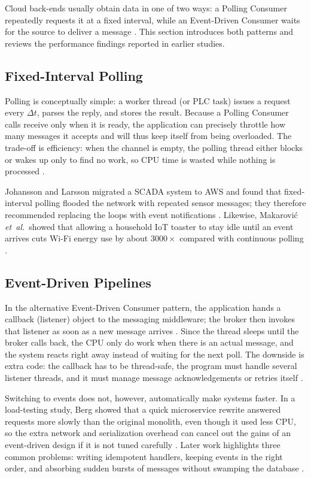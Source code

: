\documentclass[nomenclature, english, biblatex]{kththesis}
\numberwithin{listing}{chapter}
\begin{document}
Cloud back-ends usually obtain data in one of two ways: a Polling Consumer repeatedly requests it at a fixed interval, while an Event-Driven Consumer waits for the source to deliver a message \cite[Chap.~10]{Hohpe2003EIP}. This section introduces both patterns and reviews the performance findings reported in earlier studies.


\subsection{Fixed-Interval Polling}
Polling is conceptually simple: a worker thread (or PLC task) issues a request every $\Delta t$, parses the reply, and stores the result.
Because a Polling Consumer calls receive only when it is ready, the application can precisely throttle how many messages it accepts and will thus keep itself from being overloaded.
The trade-off is efficiency: when the channel is empty, the polling thread either blocks or wakes up only to find no work, so CPU time is wasted while nothing is processed \cite[pp.~494–497]{Hohpe2003EIP}.

Johansson and Larsson migrated a \gls{SCADA} system to AWS and found that fixed‐interval polling flooded the network with repeated sensor messages; they therefore recommended replacing the loops with event notifications \cite{Johansson2021SCADAIaaS}.  
Likewise, Makarović \textit{et~al.}\ showed that allowing a household IoT toaster to stay idle until an event arrives cuts Wi-Fi energy use by about \(3000\times\) compared with continuous polling \cite{Makarovi2022EnergyEfficientIoT}.


\subsection{Event-Driven Pipelines}
In the alternative Event-Driven Consumer pattern, the application hands a callback (listener) object to the messaging middleware; the broker then invokes that listener as soon as a new message arrives \cite[pp.~498–501]{Hohpe2003EIP}.  
Since the thread sleeps until the broker calls back, the CPU only do work when there is an actual message, and the system reacts right away instead of waiting for the next poll.
The downside is extra code: the callback has to be thread-safe, the program must handle several listener threads, and it must manage message acknowledgements or retries itself \cite[pp.~498–501]{Hohpe2003EIP}.

Switching to events does not, however, automatically make systems faster. In a load-testing study, Berg showed that a quick microservice rewrite answered requests more slowly than the original monolith, even though it used less CPU, so the extra network and serialization overhead can cancel out the gains of an event-driven design if it is not tuned carefully \cite{Berg2022MonolithVsMicroservices}.
Later work highlights three common problems: writing idempotent handlers, keeping events in the right order, and absorbing sudden bursts of messages without swamping the database \cite{Trindade2021EDAImpact}.
\end{document}
